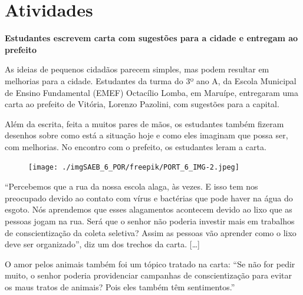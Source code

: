 \pagebreak

\section*{Atividades}

\hspace\parindent{Leia o texto a seguir e responda às questões de 1 a 4.}

\begin{myquote}
\begin{center}
\textbf{Estudantes escrevem carta com sugestões para a cidade e entregam
ao prefeito}
\end{center}

\medskip

As ideias de pequenos cidadãos parecem simples, mas podem resultar em
melhorias para a cidade. Estudantes da turma do 3º ano A, da Escola
Municipal de Ensino Fundamental (EMEF) Octacílio Lomba, em Maruípe,
entregaram uma carta ao prefeito de Vitória, Lorenzo Pazolini, com
sugestões para a capital.

Além da escrita, feita a muitos pares de mãos, os estudantes também
fizeram desenhos sobre como está a situação hoje e como eles imaginam
que possa ser, com melhorias. No encontro com o prefeito, os estudantes
leram a carta.

\begin{figure}
\centering\texttt{[image: ./imgSAEB\_6\_POR/freepik/PORT\_6\_IMG-2.jpeg]}
\end{figure}

``Percebemos que a rua da nossa escola alaga, às vezes. E isso tem nos
preocupado devido ao contato com vírus e bactérias que pode haver na
água do esgoto. Nós aprendemos que esses alagamentos acontecem devido ao
lixo que as pessoas jogam na rua. Será que o senhor não poderia investir
mais em trabalhos de conscientização da coleta seletiva? Assim as
pessoas vão aprender como o lixo deve ser organizado'', diz um dos
trechos da carta. {[}\ldots{}{]}

O amor pelos animais também foi um tópico tratado na carta: ``Se não for
pedir muito, o senhor poderia providenciar campanhas de conscientização
para evitar os maus tratos de animais? Pois eles também têm
sentimentos.''

\end{myquote}


